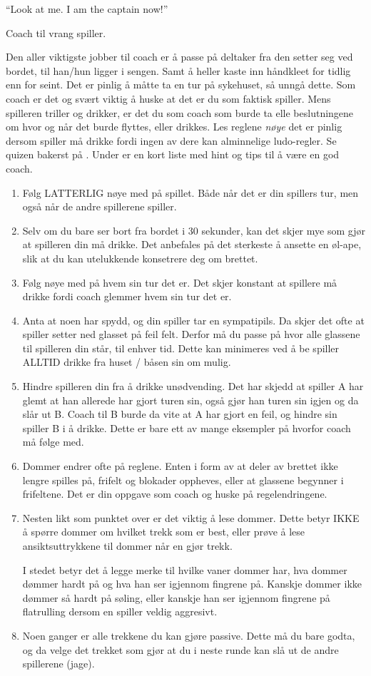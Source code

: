 \documentclass[10pt,a4paper,norsk,openany]{book}
\begin{document}
\epigraph{``Look at me. I am the captain now!''}{Coach til vrang spiller.}

Den aller viktigste jobber til coach er å passe på deltaker fra den setter seg
ved bordet, til han/hun ligger i sengen. Samt å heller kaste inn håndkleet for
tidlig enn for seint. Det er pinlig å måtte ta en tur på sykehuset, så unngå
dette. Som coach er det og svært viktig å huske at det er du som faktisk
spiller. Mens spilleren triller og drikker, er det du som coach som burde ta
elle beslutningene om hvor og når det burde flyttes, eller drikkes. Les reglene
\emph{nøye} det er pinlig dersom spiller må drikke fordi ingen av dere kan
alminnelige ludo-regler. Se quizen bakerst på \pageref{chap:quiz}. Under er en
kort liste med hint og tips til å være en god coach.

\begin{enumerate}
    \item Følg LATTERLIG nøye med på spillet. Både når det er din spillers tur,
    men også når de andre spillerene spiller. 
  \item Selv om du bare ser bort fra bordet i 30 sekunder, kan det skjer
    mye som gjør at spilleren din må drikke. Det anbefales på det sterkeste å
    ansette en øl-ape, slik at du kan utelukkende konsetrere deg om brettet. 
  \item Følg nøye med på hvem sin tur det er. Det skjer konstant at spillere må
    drikke fordi coach glemmer hvem sin tur det er.
  \item Anta at noen har spydd, og din spiller tar en sympatipils. Da skjer det
    ofte at spiller setter ned glasset på feil felt. Derfor må du passe på hvor
    alle glassene til spilleren din står, til enhver tid. Dette kan minimeres
    ved å be spiller ALLTID drikke fra huset / båsen sin om mulig.
  \item Hindre spilleren din fra å drikke unødvending. Det har skjedd at spiller
    A har glemt at han allerede har gjort turen sin, også gjør han turen sin
    igjen og da slår ut B. Coach til B burde da vite at A har gjort en feil, og
    hindre sin spiller B i å drikke. Dette er bare ett av mange eksempler på
    hvorfor coach må følge med.
  \item Dommer endrer ofte på reglene. Enten i form av at deler av brettet ikke
    lengre spilles på, frifelt og blokader oppheves, eller at glassene begynner
    i frifeltene. Det er din oppgave som coach og huske på regelendringene.
  \item Nesten likt som punktet over er det viktig å lese dommer. Dette betyr
    IKKE å spørre dommer om hvilket trekk som er best, eller prøve å lese
    ansiktsuttrykkene til dommer når en gjør trekk.

    I stedet betyr det å legge merke til hvilke vaner dommer har, hva dommer
    dømmer hardt på og hva han ser igjennom fingrene på. Kanskje dommer ikke
    dømmer så hardt på søling, eller kanskje han ser igjennom fingrene på
    flatrulling dersom en spiller veldig aggresivt.
  \item Noen ganger er alle trekkene du kan gjøre passive. Dette må du bare
    godta, og da velge det trekket som gjør at du i neste runde kan slå ut de
    andre spillerene (jage).
\end{enumerate}
\end{document}
